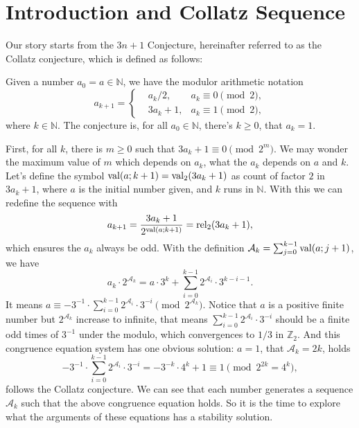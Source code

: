 \section{Introduction and Collatz Sequence}\label{sec:introduction-and-collatz-sequence} %
Our story starts from the $3n + 1$ Conjecture, hereinafter referred to as the Collatz conjecture, which is defined as follows:
\begin{conjecture}\label{conjecture:original-conjecture}
Given a number $a_0 = a \in \mathbb{N}$, we have the modulor arithmetic notation
\[a_{k+1} = \left\{\begin{aligned}
    &a_{k}/2, &a_{k}\equiv 0\pmod{2}, \\
    &3a_{k}+1, &a_{k}\equiv 1\pmod{2},
\end{aligned}\right.\]
where $k \in \mathbb{N}$.
The conjecture is, for all $a_0 \in \mathbb{N}$, there's $k \ge 0$, that $a_{k} = 1$.
\end{conjecture}

First, for all $k$, there is $m \ge 0$ such that $3a_{k}+1 \equiv 0 \pmod{2^{m}}$.
We may wonder the maximum value of $m$ which depends on $a_k$, what the $a_k$ depends on $a$ and $k$.
Let's define the symbol $\operatorname{val}(a;k+1) = \operatorname{val}_{2}(3a_{k}+1)$ as count of factor $2$ in $3a_{k}+1$, where $a$ is the initial number given, and $k$ runs in $\mathbb{N}$.
With this we can redefine the sequence with
\[ a_{k + 1} = \frac{3a_{k}+1}{2^{\operatorname{val}(a;k+1)}} = \operatorname{rel}_{2}(3a_{k}+1), \]
which ensures the $a_k$ always be odd.
With the definition $\mathcal{A}_{k} = \sum_{j=0}^{k-1}\operatorname{val}(a;j+1)$, we have
\[ a_k \cdot 2^{\mathcal{A}_k} = a \cdot 3 ^ k + \sum_{i = 0}^{k - 1}2^{\mathcal{A}_i}\cdot3^{k-i-1}. \label{equation:collatz-inductioon-3-2-1}\]
It means $a \equiv -3^{-1} \cdot \sum_{i = 0}^{k - 1}2^{\mathcal{A}_i}\cdot3^{-i} \pmod{2^{\mathcal{A}_k}}$.
Notice that $a$ is a positive finite number but $2^{\mathcal{A}_k}$ increase to infinite, that means $\sum_{i = 0}^{k - 1}2^{\mathcal{A}_i}\cdot3^{-i}$ should be a finite odd times of $3^{-1}$ under the modulo, which convergences to $1/3$ in $\mathbb{Z}_2$.
And this congruence equation system has one obvious solution: $a = 1$, that $\mathcal{A}_k = 2k$, holds
\[ -3^{-1} \cdot \sum_{i = 0}^{k - 1}2^{\mathcal{A}_i}\cdot3^{-i} = - 3^{-k}\cdot 4^k + 1 \equiv 1 \pmod{2^{2k} = 4^{k}}, \]
follows the Collatz conjecture.
We can see that each number generates a sequence $\mathcal{A}_{k}$ such that the above congruence equation holds.
So it is the time to explore what the arguments of these equations has a stability solution.

